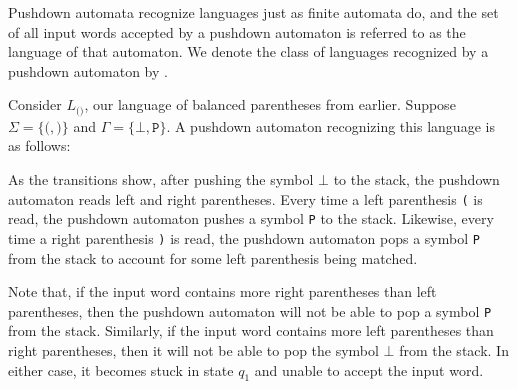 Pushdown automata recognize languages just as finite automata do, and the set of all input words accepted by a pushdown automaton is referred to as the language of that automaton. We denote the class of languages recognized by a pushdown automaton by \PDA.

\begin{example}
Consider $L_{\texttt{()}}$, our language of balanced parentheses from earlier. Suppose $\Sigma = \{\texttt{(}, \texttt{)}\}$ and $\Gamma = \{\bot, \texttt{P}\}$. A pushdown automaton recognizing this language is as follows:
\begin{center}
\end{center}
As the transitions show, after pushing the symbol $\bot$ to the stack, the pushdown automaton reads left and right parentheses. Every time a left parenthesis \texttt{(} is read, the pushdown automaton pushes a symbol \texttt{P} to the stack. Likewise, every time a right parenthesis \texttt{)} is read, the pushdown automaton pops a symbol \texttt{P} from the stack to account for some left parenthesis being matched.

Note that, if the input word contains more right parentheses than left parentheses, then the pushdown automaton will not be able to pop a symbol \texttt{P} from the stack. Similarly, if the input word contains more left parentheses than right parentheses, then it will not be able to pop the symbol $\bot$ from the stack. In either case, it becomes stuck in state $q_{1}$ and unable to accept the input word.
\end{example}

